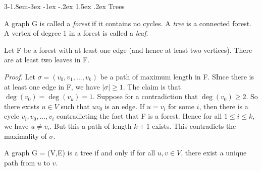 \documentclass{tufte-handout}
\makeatletter
\renewcommand{\subsection}{\@startsection{subsection}%
    {3}{-1.8em}{-3ex \@plus -1ex \@minus -.2ex}%
    {1.5ex \@plus .2ex}
    {\hspace*{-5.5em}\fcolorbox{ltblue}{ltblue}{\parbox[c][1.0ex][b]{4em}{\phantom{space}}}
    \normalfont\large\itshape\color{ltblue}}}
\makeatother
\begin{document}
\subsection{Trees}

A graph G is called a \textit{forest} if it contains no cycles. A \textit{tree} is a connected forest.
A vertex of degree 1 in a forest is called a \textit{leaf}.

\begin{Proposition}
    \label{prop:tree_leaves}
    Let F be a forest with at least one edge (and hence at least two vertices). There are at least two leaves in F.
\end{Proposition}

\textit{Proof.} Let \( \sigma = (v_0, v_1, \ldots, v_k) \) be a path of maximum length in F.
SInce there is at least one edge in F, we have \(\left|\sigma\right| \geq 1\).
The claim is that \( \deg(v_0) = \deg(v_k) = 1 \). Suppose for a contradiction that \( \deg(v_0) \geq 2 \).
So there exists \( u \in V\) such that \( uv_0\) is an edge. If \( u = v_i\) for some \( i \),
then there is a cycle \(v_i, v_0, \ldots, v_i\) contradicting the fact that F is a forest.
Hence for all \( 1 \leq i \leq k \), we have \( u \neq v_i \). But this a path of length \( k+1 \) exists.
This contradicts the maximality of \( \sigma \). \qedsymbol
{}


\begin{Proposition}
    A graph G = (V,E) is a tree if and only if for all \( u,v \in V \), there
    exist a unique path from \( u \) to \( v \).
\end{Proposition}
\end{document}
